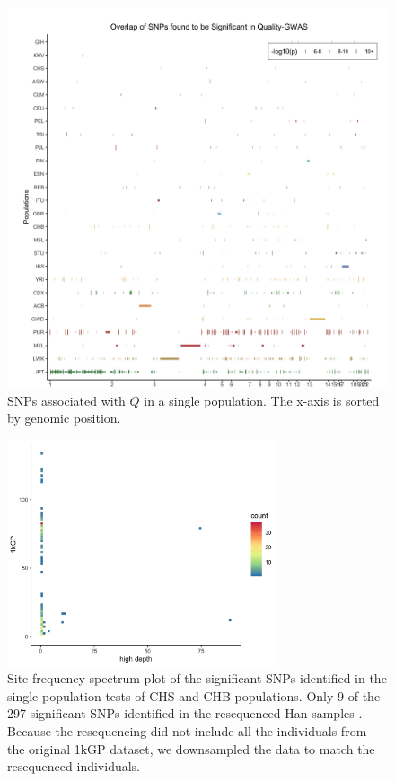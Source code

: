 \documentclass[9pt,lineno]{elife}
\begin{document}
\begin{figure}[h]
\includegraphics[width=\hsize,keepaspectratio]{./Figures/SNP6_Singles.jpg}
\caption{SNPs associated with $Q$ in a single population. The x-axis is sorted by genomic position.}
\label{Singles}
\end{figure}


\begin{figure}[h]
\includegraphics[width=8cm,keepaspectratio]{./Figures/Han83.jpg}
\caption{Site frequency spectrum plot of the significant SNPs identified in the single population tests of CHS and CHB populations. Only 9 of the 297 significant SNPs identified in the resequenced Han samples \citep{Lan2017}.
Because the resequencing did not include all the individuals from the original 1kGP dataset, we downsampled the data to match the resequenced individuals.}  
\label{90HanSFS}
\end{figure}
\end{document}
